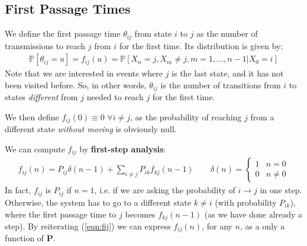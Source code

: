 \documentclass[../template.tex]{subfiles}
\begin{document}
\subsection{First Passage Times}
We define the first passage time $\theta_{ij}$ from state $i$ to $j$ as the number of transmissions to reach $j$ from $i$ for the first time. Its distribution is given by:
\begin{align*}
    \mathbb{P}[\theta_{ij} = u] = f_{ij}(u) = \mathbb{P}[X_n = j, X_m \neq j, m=1,\dots, n-1|X_0 = i]
\end{align*}
Note that we are interested in events where $j$ is the last state, and it has not been visited before. So, in other words, $\theta_{ij}$ is the number of transitions from $i$ to states \textit{different} from $j$ needed to reach $j$ for the first time. 

We then define $f_{ij}(0) \equiv 0$ $\forall i \neq j$, as the probability of reaching $j$ from a different state \textit{without moving} is obviously null.

\medskip

We can compute $f_{ij}$ by \textbf{first-step analysis}:
\begin{align}
    f_{ij}(n) = P_{ij} \delta(n-1) + \sum_{i \neq j}P_{ik} f_{kj}(n-1) \qquad \delta(n) = \begin{cases}
        1 & n = 0\\
        0 & n \neq 0
    \end{cases} \label{eqn:fij}
\end{align}
In fact, $f_{ij}$ is $P_{ij}$ if $n=1$, i.e. if we are asking the probability of $i \to j$ in one step. Otherwise, the system has to go to a different state $k \neq i$ (with probability $P_{ik}$), where the first passage time to $j$ becomes $f_{kj}(n-1)$ (as we have done already a step). By reiterating (\ref{eqn:fij}) we can express $f_{ij}(n)$, for any $n$, as a only a function of \textbf{P}.

\medskip
\end{document}
